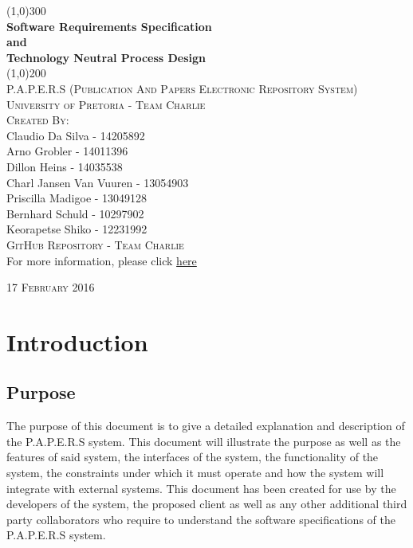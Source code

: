 \documentclass{article}
\begin{document}
	\begin{titlepage}
		\begin{center}
		
			\line(1,0){300}\\
			[6mm]
			\huge{
				\bfseries Software Requirements Specification\\
				and\\
				Technology Neutral Process Design
			}\\
			[2mm]
			\line(1,0){200}\\
			[15mm]
			\textsc{\large P.A.P.E.R.S (Publication And Papers Electronic Repository System)}\\
			[7.5mm]
			\textsc{\large University of Pretoria - Team Charlie}\\
			[20mm]
			\textsc{\large Created By:}\\
			[2mm]
			\large{
				Claudio Da Silva - 14205892\\
				Arno Grobler - 14011396\\
				Dillon Heins - 14035538\\
				Charl Jansen Van Vuuren - 13054903\\
				Priscilla Madigoe - 13049128\\
				Bernhard Schuld - 10297902\\
				Keorapetse Shiko - 12231992
			}\\
			[4cm]

		\textsc{\Large GitHub Repository - Team Charlie}\\[2mm]
		  For more information, please click \href{https://github.com/DillonHeins/Charlie}{here}
			
		\end{center}	
		\begin{flushright}
			\textsc{\large 17 February 2016}
		\end{flushright}
	\end{titlepage}
	
	\cleardoublepage
	\thispagestyle{empty}
	\tableofcontents
	
	\cleardoublepage
	\setcounter{page}{1}
	\section{Introduction}\label{sec:intro}
		\subsection{Purpose}\label{subsec:purpose}
			The purpose of this document is to give a detailed explanation and description of the P.A.P.E.R.S system. This document will illustrate the purpose as well as the features of said system, the interfaces of the system, the functionality of the system, the constraints under which it must operate and how the system will integrate with external systems. This document has been created for use by the developers of the system, the proposed client as well as any other additional third party collaborators who require to understand the software specifications of the P.A.P.E.R.S system.
		
\end{document}
